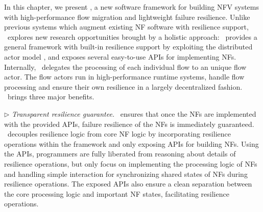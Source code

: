 


In this chapter, we present \nfactor, a new software framework for building NFV systems with high-performance flow migration and lightweight failure resilience. Unlike previous systems \cite{sherry2015rollback, rajagopalan2013pico, rajagopalan2013split, gember2015opennf} which augment existing NF software with resilience support, \nfactor~explores new research opportunities brought by a holistic approach: \nfactor~provides a general framework with built-in resilience support by exploiting the distributed actor model \cite{actor-wiki}, and exposes several easy-to-use APIs for implementing NFs. Internally, \nfactor~delegates the processing of each individual flow to an unique flow actor. The flow actors run in high-performance runtime systems, handle flow processing and ensure their own resilience in a largely decentralized fashion. \nfactor~brings three major benefits.

$\triangleright$ {\em Transparent resilience guarantee.} \nfactor~ensures that once the NFs are implemented with the provided APIs, failure resilience of the NFs is immediately guaranteed. \nfactor~decouples resilience logic from core NF logic by incorporating resilience operations within the framework and only exposing APIs for building NFs. Using the APIs, programmers are fully liberated from reasoning about details of resilience operations, but only focus on implementing the processing logic of NFs and handling simple interaction for synchronizing shared states of NFs during resilience operations. The exposed APIs also ensure a clean separation between the core processing logic and important NF states, facilitating resilience operations.

